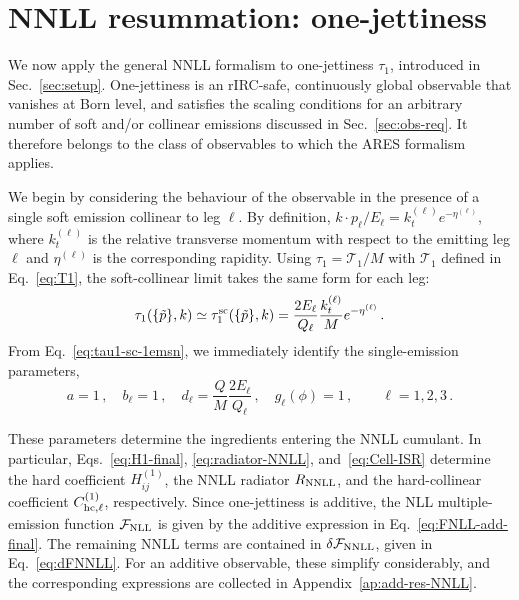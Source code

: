 \section{ NNLL resummation: one-jettiness}
\label{sec:one-jettiness}
We now apply the general NNLL formalism to one-jettiness $\tau_1$,
introduced in Sec.~\ref{sec:setup}. One-jettiness is an rIRC-safe,
continuously global observable that vanishes at Born level, and satisfies the scaling conditions for an arbitrary number of soft
and/or collinear emissions discussed in Sec.~\ref{sec:obs-req}. It
therefore belongs to the class of observables to which the
\textsc{ARES} formalism applies.

We begin by considering the behaviour of the observable in the presence of a
single soft emission collinear to leg $\ell$. By definition,
 $k\cdot p_\ell/E_\ell=k_t^{(\ell)} e^{-\eta^{(\ell)}}$, where
  $k_t^{(\ell)}$ is the relative transverse momentum with respect to
  the emitting leg $\ell$ and $\eta^{(\ell)}$ is the corresponding rapidity.
  Using $\tau_1 = \mathcal{T}_1/M$ with $\mathcal{T}_1$ defined in
Eq.~\eqref{eq:T1}, the soft-collinear limit takes the same form for each leg:
    \begin{equation}
    \label{eq:tau1-sc-1emsn}
    \tau_1(\{\tilde p\},k)\simeq \tau^{\rm sc}_1(\{\tilde p\},k) =  \frac{2E_\ell}{Q_\ell}\frac{k_t^{(\ell)}}{M} e^{-\eta^{(\ell)}}\,.
  \end{equation}
  From Eq.~\eqref{eq:tau1-sc-1emsn}, we immediately identify the single-emission
parameters,
\begin{equation}
  \label{eq:tau1-1em-props}
  a=1\,, \quad b_\ell=1\,, \quad d_\ell=\frac{Q}{M}\frac{2E_{\ell}}{Q_{\ell}} \,, \quad g_\ell(\phi) = 1\,, \qquad \ell=1,2,3\,.
\end{equation}

These parameters determine the ingredients entering the NNLL
cumulant. In particular, Eqs.~\eqref{eq:H1-final}, \eqref{eq:radiator-NNLL},
and~\eqref{eq:Cell-ISR} determine the hard coefficient
$H_{ij}^{(1)}$, the NNLL radiator $R_{\rm NNLL}$, and the
hard-collinear coefficient $C_{\rm hc,\ell}^{(1)}$, respectively.
Since one-jettiness is additive, the
NLL multiple-emission function $\mathcal{F}_{\rm NLL}$ is given by the
additive expression in Eq.~\eqref{eq:FNLL-add-final}. The remaining NNLL
terms are contained in $\delta\mathcal{F}_{\rm NNLL}$, given in
Eq.~\eqref{eq:dFNNLL}. For an additive observable, these simplify
considerably, and the corresponding expressions are collected in
Appendix~\ref{ap:add-res-NNLL}.

